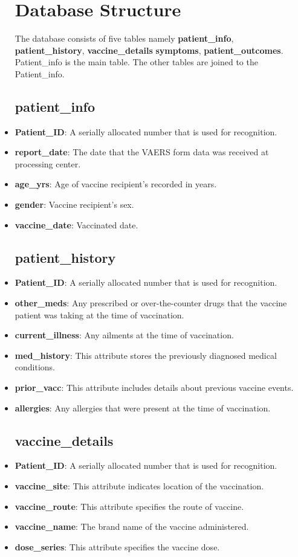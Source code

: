 \documentclass[conference]{IEEEtran}
\begin{document}
\begin{itemize}
\section{Database Structure}

The database consists of five tables namely \textbf{patient\_info}, \textbf{patient\_history}, \textbf{vaccine\_details} \textbf{symptoms}, \textbf{patient\_outcomes}. Patient\_info is the main table. The other tables are joined to the Patient\_info.

\subsection{\textbf{patient\_info}}
\item \textbf{Patient\_ID}: A serially allocated number that is used for recognition.
\item \textbf{report\_date}: The date that the VAERS form data was received at processing center.
\item \textbf{age\_yrs}: Age of vaccine recipient's recorded in years.
\item \textbf{gender}: Vaccine recipient's sex.
\item \textbf{vaccine\_date}:  Vaccinated date.

\subsection{\textbf{patient\_history}}
\item \textbf{Patient\_ID}: A serially allocated number that is used for recognition.
\item \textbf{other\_meds}: Any prescribed or over-the-counter drugs that the vaccine patient was taking at the time of vaccination.
\item \textbf{current\_illness}: Any ailments at the time of vaccination.
\item \textbf{med\_history}: This attribute stores the previously diagnosed medical conditions.
\item \textbf{prior\_vacc}: This attribute includes details about previous vaccine events.
\item \textbf{allergies}: Any allergies that were present at the time of vaccination.

\subsection{\textbf{vaccine\_details}}
\item \textbf{Patient\_ID}: A serially allocated number that is used for recognition.
\item \textbf{vaccine\_site}: This attribute indicates location of the vaccination.
\item \textbf{vaccine\_route}: This attribute specifies the route of vaccine.
\item \textbf{vaccine\_name}: The brand name of the vaccine
administered.
\item \textbf{dose\_series}: This attribute specifies the vaccine dose.

\end{itemize}
\end{document}
